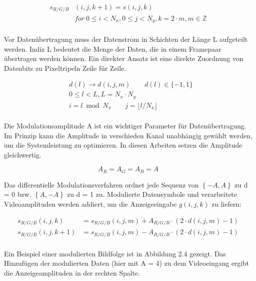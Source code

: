 \begin{equation}
\begin{split}
 s_{R/G/B}&(i,j,k+1) = s(i,j,k) \\
          &  for \ 0\le i <N_x, 0\le j<N_y,k=2 \cdot m , m \in \mathbb{Z}\\
\end{split}
\end{equation}

Vor Datenübertragung muss der Datenstrom in Schichten der Länge L aufgeteilt werden. Indiz L bedeutet die Menge der Daten, die in einem Framepaar übertragen werden können. Ein direkter Ansatz ist eine direkte Zuordnung von Datenbits zu Pixeltripeln Zeile für Zeile.

\begin{equation}
\begin{split}
  & d(l)\rightarrow d(i,j,m) \qquad d(l)\in \{-1,1\} \\
  & 0\le l <L,L = N_x \cdot N_y \\
  & i=l \bmod N_x \qquad j=\lfloor l/N_x \rfloor \\
\end{split}
\end{equation}

Die Modulationsamplitude A ist ein wichtiger Parameter für Datenübertragung. Im Prinzip kann die Amplitude in verschieden Kanal unabhängig gewählt werden, um die Systemleistung zu optimieren. In diesen Arbeiten setzen die Amplitude gleichwertig.

\begin{equation}
 A_R=A_G=A_B=A        
\end{equation}

Das differentielle Modulationsverfahren ordnet jede Sequenz von $\left\{-A, A\right\}$ zu d = 0 bzw. $\left\{A, -A\right\}$ zu d = 1 zu. Modulierte Datensymbole und verarbeitete Videoamplituden werden addiert, um die Anzeigeeingabe $g(i,j,k)$ zu liefern:

\begin{equation}
\begin{split}
   s_{R/G/B}(i,j,k)  &= s_{R/G/B}(i,j,m) + A_{R/G/B} \cdot \left( 2 \cdot d(i,j,m) - 1 \right) \\
   s_{R/G/B}(i,j,k+1)&= s_{R/G/B}(i,j,m) - A_{R/G/B} \cdot \left( 2 \cdot d(i,j,m) - 1 \right) \\
\end{split}
\end{equation}

Ein Beispiel einer modulierten Bildfolge ist in Abbildung 2.4 gezeigt. Das Hinzufügen der modulierten Daten (hier mit A = 4) zu dem Videoeingang ergibt die Anzeigeamplituden in der rechten Spalte.
\newpage

